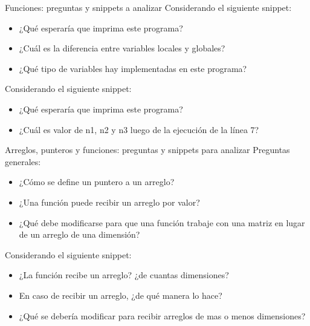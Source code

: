 \documentclass[xcolor=pdftex,table,11pt]{beamer}
\begin{document}
\begin{frame}[allowframebreaks]{Funciones: preguntas y snippets a analizar}
\newpage
Considerando el siguiente snippet:

\codesetstylefrombeamer
{}


\begin{itemize}

\item ¿Qué esperaría que imprima este programa?

\item ¿Cuál es la diferencia entre variables locales y globales?

\item ¿Qué tipo de variables hay implementadas en este programa?

\end{itemize}

\newpage
Considerando el siguiente snippet:

\codesetstylefrombeamer
{}


\begin{itemize}

\item ¿Qué esperaría que imprima este programa?

\item ¿Cuál es valor de n1, n2 y n3 luego de la ejecución de la línea 7?

\end{itemize}


\end{frame}




\begin{frame}[allowframebreaks]{Arreglos, punteros y funciones: preguntas y snippets para analizar}
Preguntas generales:


\begin{itemize}
\item ¿Cómo se define un puntero a un arreglo?
\item ¿Una función puede recibir un arreglo por valor?
\item ¿Qué debe modificarse para que una función trabaje con una matriz en lugar de un arreglo de una dimensión?


\end{itemize}
\newpage
Considerando el siguiente snippet:

\codesetstylefrombeamer
{}


\begin{itemize}

\item ¿La función recibe un arreglo? ¿de cuantas dimensiones?
\item En caso de recibir un arreglo, ¿de qué manera lo hace? 
\item ¿Qué se debería modificar para recibir arreglos de mas o menos dimensiones?



\end{itemize}

\end{frame}
\end{document}
